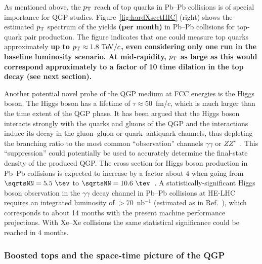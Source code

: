\documentclass[../report.tex]{subfiles}
\begin{document}
As mentioned above, the $p_{\rm T}$ reach of top quarks in Pb--Pb collisions is of special importance for QGP
studies. Figure~\ref{fig:hardXsectHIC} (right) shows the estimated $p_{\rm T}$ spectrum
of the yields {\bf (per month)} in Pb--Pb collisions for top-quark pair production. The figure indicates that one
could measure top quarks approximately {\bf up to $p_{\rm T} \approx
1.8~{\rm TeV}/c$, even considering only one run in the baseline
luminosity scenario. At mid-rapidity, $p_{\rm T}$ as large
as this would correspond approximately to a factor of 10 time dilation
in the top decay (see next section). }

Another potential novel probe of the QGP medium at FCC energies is the
Higgs boson. The Higgs boson has a lifetime of $\tau\approx 50$~fm/$c$, which is much larger than the 
time extent of the QGP phase. It has been argued that the Higgs boson
interacts strongly with the quarks and gluons of the QGP and the interactions
induce its decay in the gluon--gluon or quark--antiquark channels, thus depleting the 
branching ratio to the most common ``observation'' channels $\gamma\gamma$ or $ZZ^\star$~\cite{dEnterria:2018bqi}.
This ``suppression'' could potentially be used 
to accurately determine the final-state density of the produced QGP.
The cross section for Higgs boson production in Pb--Pb collisions is expected to
increase by a factor about 4 when going from
$\sqrtsNN=5.5~\tev$ to $\sqrtsNN=10.6~\tev$~\cite{dEnterria:2017jyt}.
A statistically-significant Higgs boson observation in the
$\gamma\gamma$ decay channel in Pb--Pb collisions at HE-LHC 
requires an integrated luminosity of $>70$~nb$^{-1}$ 
(estimated as in Ref.~\cite{dEnterria:2017jyt}), which corresponds to about 14 months with the present machine performance
projections. With Xe--Xe collisions the same statistical significance could be reached in 4 months.


\subsubsection{Boosted tops and the space-time picture of the QGP}
\label{sec:HE_boostedtops}
\end{document}
